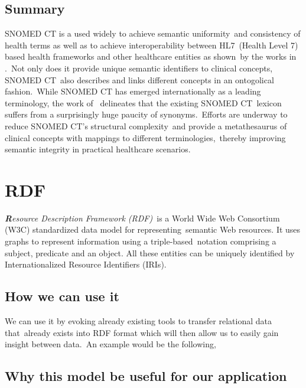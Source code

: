 \documentclass[DIV=calc, paper=a4, fontsize=12pt, onecolumn]{scrartcl}	 %
\newcommand{\initial}[1]{ %
\lettrine[lines=3,lhang=0.3,nindent=0em,slope=0em]{
\color{DarkBlue}
{\textbf{\textit{#1}}}}{}}
\begin{document}
  \subsection{Summary}
   SNOMED CT is a used widely to achieve semantic uniformity\
   and consistency of health terms as well as to achieve interoperability between HL7\
   (Health Level 7) based health frameworks and other healthcare entities as shown\
   by the works in \cite{ryan_towards_2006,arguello_executing_2009,khan_achieving_2012}.\
   Not only does it provide unique semantic identifiers to clinical concepts, SNOMED CT\
   also describes and links different concepts in an ontogolical fashion.\
   While SNOMED CT has emerged internationally as a leading terminology, the work of\
   \cite{he_clinical_2012, khare_exploiting_2012} delineates that the existing SNOMED CT\
   lexicon suffers from a surprisingly huge paucity of synonyms.\
   Efforts are underway to reduce SNOMED CT's structural complexity\
   and provide a metathesaurus of clinical concepts with mappings to different terminologies,\
   thereby improving semantic integrity in practical healthcare scenarios.\
   \cite{lindberg_unified_1993,wei_using_2012}

 \section[Resource Description Framework (RDF)]{RDF}

\initial{R}\textit{esource Description Framework (RDF)}\
is a World Wide Web Consortium (W3C) standardized data model for representing\
semantic Web resources. It uses graphs to represent information using a triple-based\
 notation comprising a subject, predicate and an object. All these entities can be uniquely identified by Internationalized Resource Identifiers (IRIs).\\

\subsection{How we can use it}

We can use it by evoking already existing tools to transfer relational data that\
already exists into RDF format which will then allow us to easily gain insight between data.\
An example would be the following,

\subsection{Why this model be useful for our application}
\end{document}
